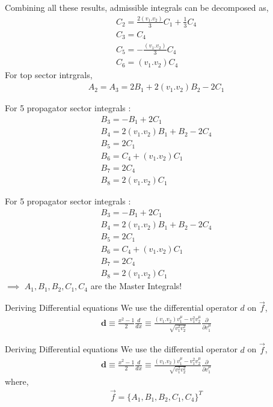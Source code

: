 \documentclass[11pt]{beamer}
\begin{document}
\begin{frame}
	Combining all these results, admissible integrals can be decomposed as,
	\begin{align*}
		C_2=\frac{2(v_1.v_2)}{3}C_1+\frac{1}{3}C_4\\
		C_3=C_4\\
		C_5=-\frac{(v_1.v_2)}{3}C_4\\
		C_6=(v_1.v_2)C_4
	\end{align*}
For top sector intrgrals,
\begin{align*}
	A_2=A_3=2B_1+2(v_1.v_2)B_2-2C_1
\end{align*}
\end{frame}
\begin{frame}
	For 5 propagator sector integrals : 
	\begin{align*}
		B_3=-B_1+2C_1\\
		B_4=2(v_1.v_2)B_1+B_2-2C_4\\
		B_5=2C_1\\
		B_6=C_4+(v_1.v_2)C_1\\
		B_7=2C_4\\
		B_8=2(v_1.v_2)C_1
	\end{align*}
\end{frame}
\begin{frame}
	For 5 propagator sector integrals : 
	\begin{align*}
		B_3=-B_1+2C_1\\
		B_4=2(v_1.v_2)B_1+B_2-2C_4\\
		B_5=2C_1\\
		B_6=C_4+(v_1.v_2)C_1\\
		B_7=2C_4\\
		B_8=2(v_1.v_2)C_1
	\end{align*}
$\implies$ {$A_1,B_1,B_2,C_1,C_4$} are the Master Integrals!
\end{frame}
\begin{frame} {Deriving Differential equations}
	 We use the differential operator $d$ on $\vec{f}$,
	\begin{align*}
		\boldsymbol{d} \equiv \frac{x^2-1}{2}\frac{d}{dx}\equiv \frac{(v_1.v_2)v_1^\mu-v_1^2v_2^\mu}{\sqrt{v_1^2v_2^2}}\frac{\partial}{\partial v_1^\mu}
	\end{align*}
\end{frame}
\begin{frame} {Deriving Differential equations}
	We use the differential operator $d$ on $\vec{f}$,
	\begin{align*}
		\boldsymbol{d} \equiv \frac{x^2-1}{2}\frac{d}{dx}\equiv \frac{(v_1.v_2)v_1^\mu-v_1^2v_2^\mu}{\sqrt{v_1^2v_2^2}}\frac{\partial}{\partial v_1^\mu}
	\end{align*}
where,
\begin{align*}
	\vec{f}=\{A_1,B_1,B_2,C_1,C_4\}^T
\end{align*}
\end{frame}
\end{document}
